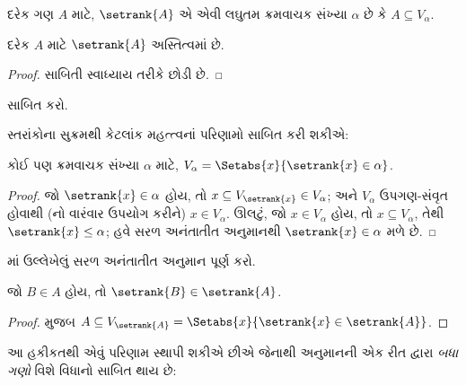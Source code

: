\begin{defn}
દરેક ગણ $A$ માટે, $\setrank{A}$ એ એવી લઘુતમ ક્રમવાચક સંખ્યા
$\alpha$ છે કે $A
\subseteq V_\alpha$.
\end{defn}
\begin{prop}
	દરેક $A$ માટે $\setrank{A}$ અસ્તિત્વમાં છે.
\end{prop}
\begin{proof}
	સાબિતી સ્વાધ્યાય તરીકે છોડી છે.
\end{proof}
\begin{prob}
	 સાબિત કરો.
\end{prob}
\noindent 
સ્તરાંકોના સુક્રમથી કેટલાંક મહત્ત્વનાં પરિણામો સાબિત કરી શકીએ:
\begin{prop}
કોઈ પણ ક્રમવાચક સંખ્યા $\alpha$ માટે,
$V_\alpha = \Setabs{x}{\setrank{x} \in \alpha}$.
\end{prop}

\begin{proof}
જો $\setrank{x} \in \alpha$ હોય, તો $x \subseteq V_{\setrank{x}} \in
V_\alpha$; અને $V_\alpha$ ઉપગણ-સંવૃત હોવાથી
(નો વારંવાર ઉપયોગ કરીને)
$x \in V_\alpha$. ઊલટું, જો $x \in V_\alpha$ હોય, તો
$x \subseteq V_\alpha$, તેથી $\setrank{x} \leq \alpha$;
હવે સરળ અનંતાતીત અનુમાનથી $\setrank{x} \in \alpha$ મળે છે.
\end{proof}
\begin{prob}
	માં ઉલ્લેખેલું
	સરળ અનંતાતીત અનુમાન પૂર્ણ કરો.
\end{prob}

\begin{prop}
જો $B \in A$ હોય, તો $\setrank{B} \in \setrank{A}$.
\end{prop}

\begin{proof}
 મુજબ
$A \subseteq V_{\setrank{A}} = \Setabs{x}{\setrank{x} \in
\setrank{A}}$.
\end{proof}
\noindent
આ હકીકતથી એવું પરિણામ સ્થાપી શકીએ છીએ જેનાથી અનુમાનની
એક રીત દ્વારા \emph{બધા ગણો} વિશે વિધાનો સાબિત થાય છે:

